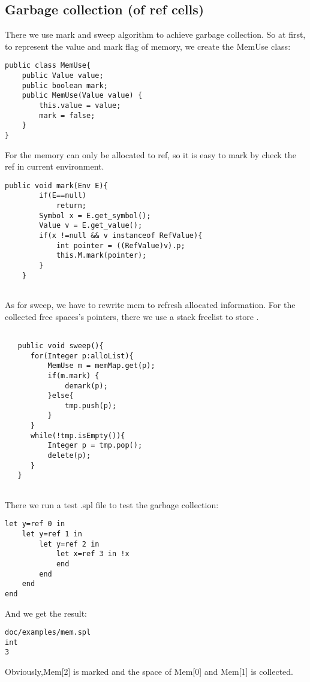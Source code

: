 \documentclass[paper=a4, fontsize=11pt]{scrartcl}
\begin{document}
\subsection{Garbage collection (of ref cells)}
There we use mark and sweep algorithm to achieve garbage collection. So at first, to represent the value and mark flag of memory, we create the MemUse class:
\begin{lstlisting}[title=MemUse.java, frame=shadowbox]
public class MemUse{
    public Value value;
    public boolean mark;
    public MemUse(Value value) {
        this.value = value;
        mark = false;
    }
}

\end{lstlisting}
For the memory can only be allocated to ref, so it is easy to mark by check the ref in current environment.
\begin{lstlisting}[title=State.java, frame=shadowbox]
    public void mark(Env E){
        if(E==null)
            return;
        Symbol x = E.get_symbol();
        Value v = E.get_value();
        if(x !=null && v instanceof RefValue){
            int pointer = ((RefValue)v).p;
            this.M.mark(pointer);
        }
    }
    

\end{lstlisting}
As for sweep, we have to rewrite mem to refresh allocated information. For the collected free spaces’s pointers, there we use a stack freelist to store .
\begin{lstlisting}[title=Mem.java, frame=shadowbox]
   
   public void sweep(){
      for(Integer p:alloList){
          MemUse m = memMap.get(p);
          if(m.mark) {
              demark(p);
          }else{
              tmp.push(p);
          }
      }
      while(!tmp.isEmpty()){
          Integer p = tmp.pop();
          delete(p);
      }
   }
   
\end{lstlisting}
There we run a test .spl file to test the garbage collection:
\begin{lstlisting}[title=mem.spl, frame=shadowbox]
let y=ref 0 in
	let y=ref 1 in
		let y=ref 2 in
			let x=ref 3 in !x
			end
		end 
	end
end
\end{lstlisting}
And we get the result:
\begin{lstlisting}[title=Result, frame=shadowbox]
doc/examples/mem.spl
int
3
\end{lstlisting}
Obviously,Mem[2] is marked and the space of Mem[0] and Mem[1] is collected.
\end{document}
